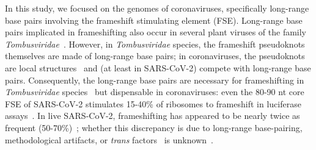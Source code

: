 \documentclass[main.tex]{subfiles}
\begin{document}
In this study, we focused on the genomes of coronaviruses, specifically long-range base pairs involving the frameshift stimulating element (FSE).
Long-range base pairs implicated in frameshifting also occur in several plant viruses of the family \textit{Tombusviridae}~\cite{Barry2002,Tajima2011,Mikkelsen2023}.
However, in \textit{Tombusviridae} species, the frameshift pseudoknots themselves are made of long-range base pairs; in coronaviruses, the pseudoknots are local structures~\cite{Brierley1989,Herald1993,Plant2005b,KZhang2021} and (at least in SARS-CoV-2) compete with long-range base pairs.
Consequently, the long-range base pairs are necessary for frameshifting in \textit{Tombusviridae} species~\cite{Barry2002,Tajima2011,Mikkelsen2023} but dispensable in coronaviruses: even the 80-90 nt core FSE of SARS-CoV-2 stimulates 15-40\% of ribosomes to frameshift in luciferase assays~\cite{Kelly2020,Haniff2020,KZhang2021,Bhatt2021,YSun2021,Lan2022}.
In live SARS-CoV-2, frameshifting has appeared to be nearly twice as frequent (50-70\%)~\cite{Finkel2021a,Kim2021,PurayChavez2022}; whether this discrepancy is due to long-range base-pairing, methodological artifacts, or \textit{trans} factors~\cite{Riegger2022} is unknown~\cite{Allan2023}.
\end{document}
